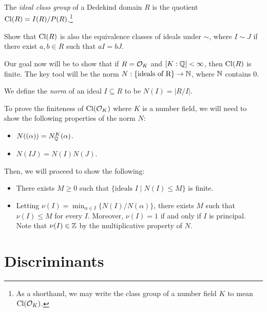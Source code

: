 \begin{definition}
  The \emph{ideal class group} of a Dedekind domain $R$
  is 
  the quotient $\operatorname{Cl}(R) = I(R) / P(R)$.\footnote{As a shorthand, we may write the class group of
  a number field $K$ to mean $\operatorname{Cl}(\mathcal{O}_K)$.}
\end{definition}

\begin{exercise}
  Show that $\operatorname{Cl}(R)$ is also the equivalence classes
  of ideals under $\sim$, where $I \sim J$ if
  there exist $a, b \in R$ such that $aI = bJ$.
\end{exercise}


\begin{remark}
  Our goal now will be to show that if $R = \mathcal{O}_K$
  and $[K : \mathbb{Q}] < \infty$, then $\operatorname{Cl}(R)$ is finite.
  The key tool will be the norm
  $N : \{\text{ideals of R}\} \to \mathbb{N}$, where
  $\mathbb{N}$ contains $0$.
\end{remark}

\begin{definition}
  We define the \emph{norm} of an ideal $I \subseteq R$
  to be $N(I) = |R/I|$.
\end{definition}

\begin{remark}
  To prove the finiteness of $\operatorname{Cl}(\mathcal{O}_K)$ where
  $K$ is a number field,
  we will need to show the following properties of the
  norm $N$:
  \begin{itemize}
    \item $N((\alpha)) = N^{K}_{\mathbb{Q}}(\alpha)$.
    \item $N(IJ) = N(I) N(J)$.
  \end{itemize}
  Then, we will proceed to show the following:
  \begin{itemize}
    \item There exists $M \ge 0$ such that
      $\{\text{ideals } I \mid N(I) \le M\}$ is finite.
    \item Letting $\nu(I) = \min_{\alpha \in I} \{N(I) / N(\alpha)\}$,
      there exists $M$ such that
      $\nu(I) \le M$ for every $I$.
      Moreover, $\nu(I) = 1$ if and only if
      $I$ is principal.
      Note that
      $\nu(I) \in \mathbb{Z}$ by the multiplicative property
      of $N$.
  \end{itemize}
\end{remark}

\section{Discriminants}

